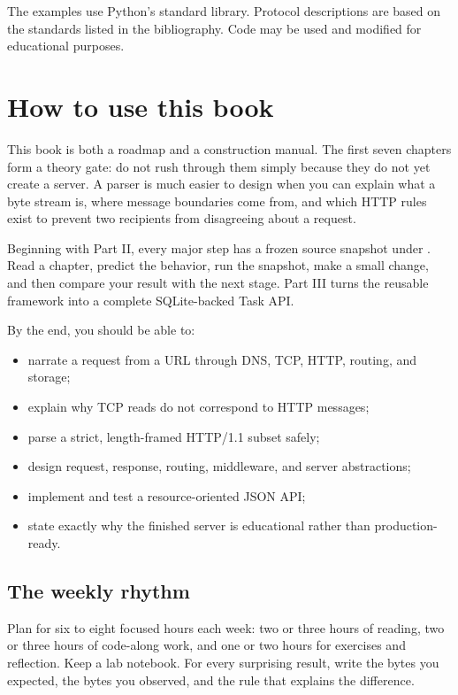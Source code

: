 \vspace{2em}
\noindent The examples use Python's standard library. Protocol descriptions
are based on the standards listed in the bibliography. Code may be used and
modified for educational purposes.
\clearpage

\chapter{How to use this book}

This book is both a roadmap and a construction manual. The first seven
chapters form a theory gate: do not rush through them simply because they do
not yet create a server. A parser is much easier to design when you can explain
what a byte stream is, where message boundaries come from, and which HTTP rules
exist to prevent two recipients from disagreeing about a request.

Beginning with Part II, every major step has a frozen source snapshot under
. Read a chapter, predict the behavior, run the snapshot,
make a small change, and then compare your result with the next stage. Part III
turns the reusable framework into a complete SQLite-backed Task API.

\begin{objectives}
By the end, you should be able to:
\begin{itemize}
  \item narrate a request from a URL through DNS, TCP, HTTP, routing, and storage;
  \item explain why TCP reads do not correspond to HTTP messages;
  \item parse a strict, length-framed HTTP/1.1 subset safely;
  \item design request, response, routing, middleware, and server abstractions;
  \item implement and test a resource-oriented JSON API;
  \item state exactly why the finished server is educational rather than production-ready.
\end{itemize}
\end{objectives}

\section{The weekly rhythm}

Plan for six to eight focused hours each week: two or three hours of reading,
two or three hours of code-along work, and one or two hours for exercises and
reflection. Keep a lab notebook. For every surprising result, write the bytes
you expected, the bytes you observed, and the rule that explains the difference.

